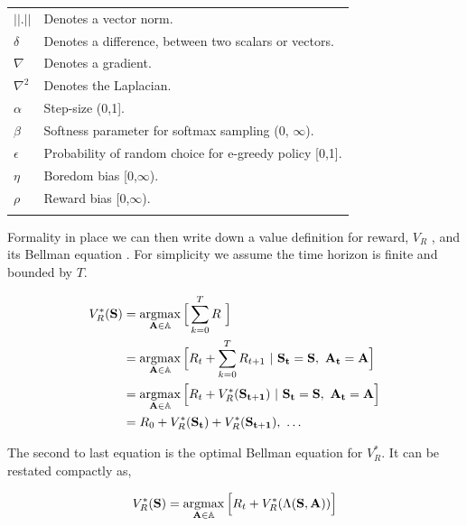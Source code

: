 \begin{table}[]
\begin{tabular}{ll}
    $||.||$ & Denotes a vector norm. \\
    $\delta$ & Denotes a difference, between two scalars or vectors. \\
    $\nabla$ & Denotes a gradient. \\
    $\nabla^2$ & Denotes the Laplacian. \\
    $\alpha$ & Step-size (0,1]. \\
    $\beta$ & Softness parameter for softmax sampling (0, $\infty$). \\
    $\epsilon$ & Probability of random choice for e-greedy policy [0,1]. \\
    $\eta$ & Boredom bias [0,$\infty$). \\
    $\rho$ & Reward bias [0,$\infty$). \\
    &                          
    \end{tabular}
	\label{tab:notation}
\end{table}
 
Formality in place we can then write down a value definition for reward, $V_{R}$ \cite{Sutton2018}, and its Bellman equation \cite{Bellmann1954}. For simplicity we assume the time horizon is finite and bounded by $T$.

\begin{equation} 
	\label{eq:bellman_seq}
    \begin{split}
        V^*_{R}(\mathbf{S}) &= \argmax_{\mathbf{A} \in \mathbb{A}} \Big [\sum_{k=0}^{T}  R \ \Big ]\\
                         	&= \argmax_{\mathbf{A} \in \mathbb{A}} \Big [ R_{t} + \sum_{k=0}^{T} R_{t+1} \ | \ \mathbf{S_t} = \mathbf{S},\ \mathbf{A_t} = \mathbf{A} \Big ]\\
							&= \argmax_{\mathbf{A} \in \mathbb{A}} \Big [ R_{t} + V^*_{R}(\mathbf{S_{t+1}}) \ | \ \mathbf{S_t} = \mathbf{S},\ \mathbf{A_t} = \mathbf{A} \Big ]\\
                         	&= R_0 + V^*_{R}(\mathbf{S_{t}}) + V^*_{R}(\mathbf{S_{t+1}}),\ \ldots
    \end{split}
\end{equation}

The second to last equation is the optimal Bellman equation for $V^*_R$. It can be restated compactly as,

\begin{equation} 
\label{eq:bellman_iter}
V^*_R(\mathbf{S}) = \operatorname*{argmax}_{\mathbf{A} \in \mathbb{A}} \Big [ R_{t}  + V^*_{R}(\Lambda(\mathbf{S},\mathbf{A})) \Big ]
\end{equation}

